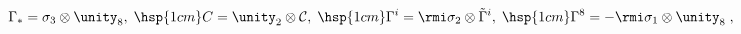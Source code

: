 \begin{equation}
\Gamma_*=\sigma_3\otimes \unity_8 , \; \hsp{1cm}
C= \unity_2\otimes \mathcal{C},\;                 \hsp{1cm}
\Gamma^i=\rmi \sigma_2\otimes\tilde{\Gamma}^i,\; \hsp{1cm}
\Gamma^8=-\rmi \sigma_1\otimes \unity_8\; ,
\end{equation}

